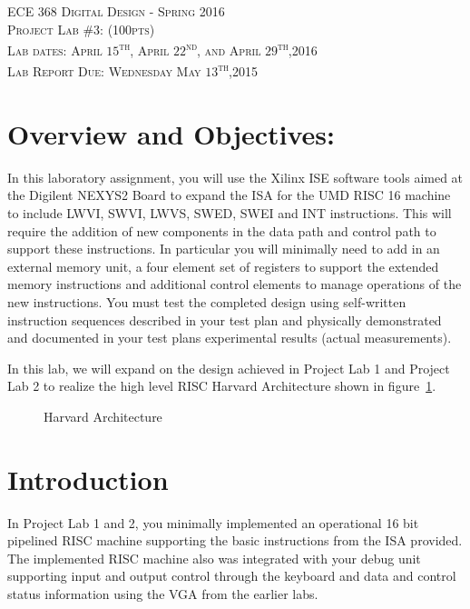 \documentclass{article}
\begin{document}
\begin{center}
\textsc{\huge ECE 368 Digital Design - Spring 2016}\\[1cm]
\textsc{{\LARGE Project Lab \#3: (100pts)}}\\[0.5cm]
\textsc{\Large Lab dates: April $15$\textsuperscript{th}, April $22$\textsuperscript{nd}, and April $29$\textsuperscript{th},2016}\\[0.5cm]
\textsc{\Large Lab Report Due: Wednesday May $13$\textsuperscript{th},2015}\\[1cm]
\end{center}

\section{Overview and Objectives:}
In this laboratory assignment, you will use the Xilinx ISE software tools aimed at the Digilent NEXYS2 Board to expand the ISA for the UMD RISC 16 machine to include LWVI, SWVI, LWVS, SWED, SWEI and INT instructions. This will require the addition of new components in the data path and control path to support these instructions. In particular you will minimally need to add in an external memory unit, a four element set of registers to support the extended memory instructions and additional control elements to manage operations of the new instructions. You must test the completed design using self-written instruction sequences described in your test plan and physically demonstrated and documented in your test plans experimental results (actual measurements).

In this lab, we will expand on the design achieved in Project Lab 1 and Project Lab 2 to realize the high level RISC Harvard Architecture shown in figure~\ref{fig:harvardarc}.

\begin{figure}[!htbp]
  \centering
  \caption{Harvard Architecture}
  \label{fig:harvardarc}
\end{figure}
\FloatBarrier

\section{Introduction}

In Project Lab 1 and 2, you minimally implemented an operational 16 bit pipelined RISC machine supporting the basic instructions from the ISA provided. The implemented RISC machine also was integrated with your debug unit supporting input and output control through the keyboard and data and control status information using the VGA from the earlier labs. 
\end{document}
